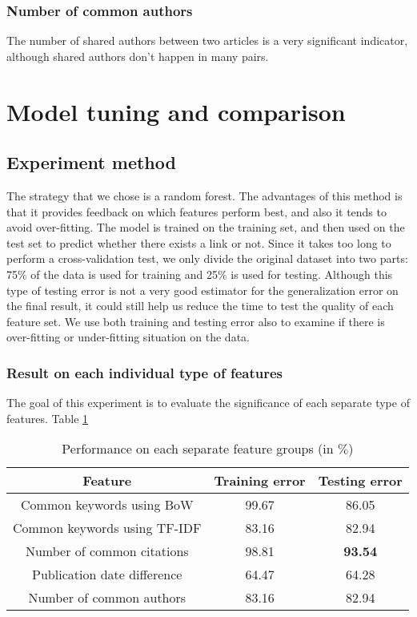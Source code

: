 \documentclass{article}
\begin{document}
\subsubsection{Number of common authors}

The number of shared authors between two articles is a very significant indicator, although shared authors don't happen in many pairs.

\section{Model tuning and comparison}
\label{sec:experiments}

\subsection{Experiment method}

The strategy that we chose is a random forest. The advantages of this method is that it provides feedback on which features perform best, and also it tends to avoid over-fitting. The model is trained on the training set, and then used on the test set to predict whether there exists a link or not. Since it takes too long to perform a cross-validation test, we only divide the original dataset into two parts: 75$\%$ of the data is used for training and 25$\%$ is used for testing. Although this type of testing error is not a very good estimator for the generalization error on the final result, it could still help us reduce the time to test the quality of each feature set. We use both training and testing error also to examine if there is over-fitting or under-fitting situation on the data.
\subsubsection{Result on each individual type of features}
The goal of this experiment is to evaluate the significance of each separate type of features. Table \ref{tab:separate}
\begin{table}
	\label{tab:separate}
	\centering
	\caption{Performance on each separate feature groups (in $\%$)}
	\begin{tabular}{|c|c|c|} \hline
		Feature&Training error&Testing error\\ \hline
		Common keywords using BoW&99.67&86.05\\ \hline
		Common keywords using TF-IDF&83.16&82.94\\ \hline
		Number of common citations&98.81&\textbf{93.54}\\ \hline
		Publication date difference&64.47&64.28\\ \hline
		Number of common authors&83.16&82.94\\ \hline
	\end{tabular}
\end{table}
\end{document}
